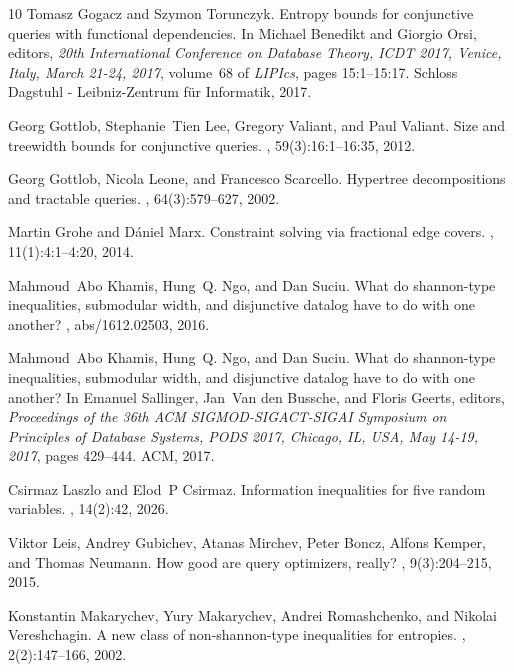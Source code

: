 \documentclass[a4paper,cleveref]{lipics-v2021}
\begin{document}
\begin{thebibliography}{10}
Tomasz Gogacz and Szymon Torunczyk.
\newblock Entropy bounds for conjunctive queries with functional dependencies.
\newblock In Michael Benedikt and Giorgio Orsi, editors, {\em 20th
  International Conference on Database Theory, {ICDT} 2017, Venice, Italy,
  March 21-24, 2017}, volume~68 of {\em LIPIcs}, pages 15:1--15:17. Schloss
  Dagstuhl - Leibniz-Zentrum f{\"{u}}r Informatik, 2017.

Georg Gottlob, Stephanie~Tien Lee, Gregory Valiant, and Paul Valiant.
\newblock Size and treewidth bounds for conjunctive queries.
, 59(3):16:1--16:35, 2012.

Georg Gottlob, Nicola Leone, and Francesco Scarcello.
\newblock Hypertree decompositions and tractable queries.
, 64(3):579--627, 2002.

Martin Grohe and D{\'{a}}niel Marx.
\newblock Constraint solving via fractional edge covers.
, 11(1):4:1--4:20, 2014.

Mahmoud~Abo Khamis, Hung~Q. Ngo, and Dan Suciu.
\newblock What do shannon-type inequalities, submodular width, and disjunctive
  datalog have to do with one another?
, abs/1612.02503, 2016.

Mahmoud~Abo Khamis, Hung~Q. Ngo, and Dan Suciu.
\newblock What do shannon-type inequalities, submodular width, and disjunctive
  datalog have to do with one another?
\newblock In Emanuel Sallinger, Jan~Van den Bussche, and Floris Geerts,
  editors, {\em Proceedings of the 36th {ACM} {SIGMOD-SIGACT-SIGAI} Symposium
  on Principles of Database Systems, {PODS} 2017, Chicago, IL, USA, May 14-19,
  2017}, pages 429--444. {ACM}, 2017.

Csirmaz Laszlo and Elod~P Csirmaz.
\newblock Information inequalities for five random variables.
, 14(2):42, 2026.

Viktor Leis, Andrey Gubichev, Atanas Mirchev, Peter Boncz, Alfons Kemper, and
  Thomas Neumann.
\newblock How good are query optimizers, really?
, 9(3):204--215, 2015.

Konstantin Makarychev, Yury Makarychev, Andrei Romashchenko, and Nikolai
  Vereshchagin.
\newblock A new class of non-shannon-type inequalities for entropies.
, 2(2):147--166, 2002.


\end{thebibliography}
\end{document}

